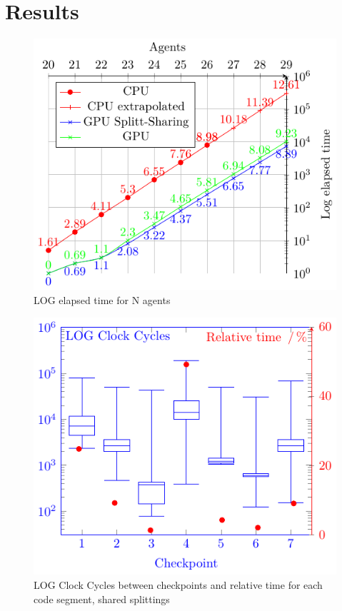 \documentclass{llncs}
\begin{document}
\section{Results}
\begin{figure}[width=\linewidth]
\includegraphics[width=\linewidth]{fig1cycles}
\caption{LOG elapsed time for N agents\label{time}}
\end{figure}
\begin{figure}[width=\linewidth]
\includegraphics[width=\linewidth]{fig2cycles}
\caption{LOG Clock Cycles between checkpoints and relative time for each code segment, shared splittings\label{splitt}}
\end{figure}
\end{document}
